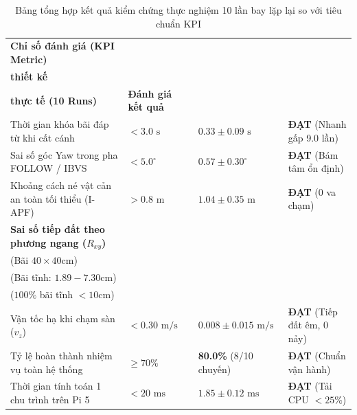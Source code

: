\documentclass[12pt,a4paper]{article}
\begin{document}
\begin{table}[h!]
\centering
\small
\renewcommand{\arraystretch}{1.25}
\renewcommand{\tabularxcolumn}[1]{m{#1}}
\begin{tabularx}{\textwidth}{@{} >{\raggedright\arraybackslash}X 
                                 >{\centering\arraybackslash}m{2.5cm} 
                                 >{\centering\arraybackslash}m{4.0cm} 
                                 >{\raggedright\arraybackslash}m{3.8cm} @{}}
\toprule
\textbf{Chỉ số đánh giá (KPI Metric)} & \makecell{\textbf{Tiêu chuẩn}\\\textbf{thiết kế}} & \makecell{\textbf{Kết quả đo đạc}\\\textbf{thực tế (10 Runs)}} & \textbf{Đánh giá kết quả} \\ \midrule
Thời gian khóa bãi đáp từ khi cất cánh & $< 3.0\text{ s}$ & \textbf{$0.33 \pm 0.09\text{ s}$} & \textcolor{successgreen}{\textbf{ĐẠT}} (Nhanh gấp 9.0 lần) \\
Sai số góc Yaw trong pha FOLLOW / IBVS & $< 5.0^\circ$ & \textbf{$0.57 \pm 0.30^\circ$} & \textcolor{successgreen}{\textbf{ĐẠT}} (Bám tâm ổn định) \\
Khoảng cách né vật cản an toàn tối thiểu (I-APF) & $> 0.8\text{ m}$ & \textbf{$1.04 \pm 0.35\text{ m}$} & \textcolor{successgreen}{\textbf{ĐẠT}} (0 va chạm) \\
\textbf{Sai số tiếp đất theo phương ngang ($R_{xy}$)} & \makecell{$< 20.0\text{ cm}$\\\scriptsize(Bãi $40\times 40\text{cm}$)} & \makecell{\textbf{$4.14 \pm 2.45\text{ cm}$}\\\scriptsize(Bãi tĩnh: $1.89 - 7.30\text{cm}$)} & \makecell[l]{\textcolor{primaryblue}{\textbf{XUẤT SẮC}}\\\scriptsize($100\%$ bãi tĩnh $<10\text{cm}$)} \\
Vận tốc hạ khi chạm sàn ($v_z$) & $< 0.30\text{ m/s}$ & \textbf{$0.008 \pm 0.015\text{ m/s}$} & \textcolor{successgreen}{\textbf{ĐẠT}} (Tiếp đất êm, 0 nảy) \\
Tỷ lệ hoàn thành nhiệm vụ toàn hệ thống & $\ge 70\%$ & \textbf{80.0\%} (8/10 chuyến) & \textcolor{successgreen}{\textbf{ĐẠT}} (Chuẩn vận hành) \\
Thời gian tính toán 1 chu trình trên Pi 5 & $< 20\text{ ms}$ & \textbf{$1.85 \pm 0.12\text{ ms}$} & \textcolor{successgreen}{\textbf{ĐẠT}} (Tải CPU $< 25\%$) \\ \bottomrule
\end{tabularx}
\caption{Bảng tổng hợp kết quả kiểm chứng thực nghiệm 10 lần bay lặp lại so với tiêu chuẩn KPI}
\label{tab:kpi_results}
\end{table}
\end{document}
